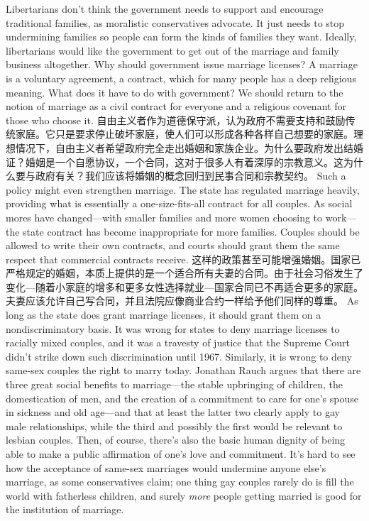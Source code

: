 \begin{paracol}{2}
\switchcolumn*
Libertarians don't think the government needs to support and encourage traditional families, as moralistic conservatives advocate. It just needs to stop undermining families so people can form the kinds of families they want. Ideally, libertarians would like the government to get out of the marriage and family business altogether. Why should government issue marriage licenses? A marriage is a voluntary agreement, a contract, which for many people has a deep religious meaning. What does it have to do with government? We should return to the notion of marriage as a civil contract for everyone and a religious covenant for those who choose it.
\switchcolumn
自由主义者作为道德保守派，认为政府不需要支持和鼓励传统家庭。它只是要求停止破坏家庭，使人们可以形成各种各样自己想要的家庭。理想情况下，自由主义者希望政府完全走出婚姻和家族企业。为什么要政府发出结婚证？婚姻是一个自愿协议，一个合同，这对于很多人有着深厚的宗教意义。这为什么要与政府有关？我们应该将婚姻的概念回归到民事合同和宗教契约。
\switchcolumn*
Such a policy might even strengthen marriage. The state has regulated marriage heavily, providing what is essentially a one-size-fits-all contract for all couples. As social mores have changed---with smaller families and more women choosing to work---the state contract has become inappropriate for more families. Couples should be allowed to write their own contracts, and courts should grant them the same respect that commercial contracts receive.
\switchcolumn
这样的政策甚至可能增强婚姻。国家已严格规定的婚姻，本质上提供的是一个适合所有夫妻的合同。由于社会习俗发生了变化---随着小家庭的增多和更多女性选择就业---国家合同已不再适合更多的家庭。夫妻应该允许自己写合同，并且法院应像商业合约一样给予他们同样的尊重。
\switchcolumn*
As long as the state does grant marriage licenses, it should grant them on a nondiscriminatory basis. It was wrong for states to deny marriage licenses to racially mixed couples, and it was a travesty of justice that the Supreme Court didn't strike down such discrimination until 1967. Similarly, it is wrong to deny same-sex couples the right to marry today. Jonathan Rauch argues that there are three great social benefits to marriage---the stable upbringing of children, the domestication of men, and the creation of a commitment to care for one's spouse in sickness and old age---and that at least the latter two clearly apply to gay male relationships, while the third and possibly the first would be relevant to lesbian couples. Then, of course, there's also the basic human dignity of being able to make a public affirmation of one's love and commitment. It's hard to see how the acceptance of same-sex marriages would undermine anyone else's marriage, as some conservatives claim; one thing gay couples rarely do is fill the world with fatherless children, and surely \textit{more} people getting married is good for the institution of marriage.

\end{paracol}
